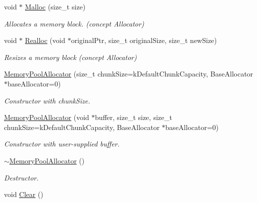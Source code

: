 \begin{DoxyCompactItemize}
\mbox{\label{classMemoryPoolAllocator_a02f6832910453446cb77bf919ba49e99}} 
void $\ast$ \hyperlink{classMemoryPoolAllocator_a02f6832910453446cb77bf919ba49e99}{Malloc} (size\+\_\+t size)
\begin{DoxyCompactList}\small\item\em Allocates a memory block. (concept Allocator) \end{DoxyCompactList}\item 
\mbox{\label{classMemoryPoolAllocator_aba75280d42184b0ad414243f7f5ac6c7}} 
void $\ast$ \hyperlink{classMemoryPoolAllocator_aba75280d42184b0ad414243f7f5ac6c7}{Realloc} (void $\ast$original\+Ptr, size\+\_\+t original\+Size, size\+\_\+t new\+Size)
\begin{DoxyCompactList}\small\item\em Resizes a memory block (concept Allocator) \end{DoxyCompactList}\item 
\hyperlink{classMemoryPoolAllocator_aeec85ac657f242ac5620115141be5209}{Memory\+Pool\+Allocator} (size\+\_\+t chunk\+Size=k\+Default\+Chunk\+Capacity, Base\+Allocator $\ast$base\+Allocator=0)
\begin{DoxyCompactList}\small\item\em Constructor with chunk\+Size. \end{DoxyCompactList}\item 
\hyperlink{classMemoryPoolAllocator_a1f0d865093fdb955d956b7a445a8ddbf}{Memory\+Pool\+Allocator} (void $\ast$buffer, size\+\_\+t size, size\+\_\+t chunk\+Size=k\+Default\+Chunk\+Capacity, Base\+Allocator $\ast$base\+Allocator=0)
\begin{DoxyCompactList}\small\item\em Constructor with user-\/supplied buffer. \end{DoxyCompactList}\item 
\hyperlink{classMemoryPoolAllocator_ad4eee0ef3cfe8cda31034fbce98b7a9b}{$\sim$\+Memory\+Pool\+Allocator} ()
\begin{DoxyCompactList}\small\item\em Destructor. \end{DoxyCompactList}\item 
\mbox{\label{classMemoryPoolAllocator_a57bbc80e570db6110901b9a7e36dbda0}} 
void \hyperlink{classMemoryPoolAllocator_a57bbc80e570db6110901b9a7e36dbda0}{Clear} ()

\end{DoxyCompactItemize}
